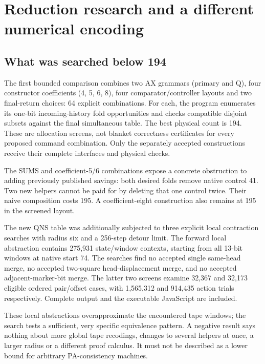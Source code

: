 \section{Reduction research and a different numerical encoding}
\label{sec:research}

\subsection{What was searched below 194}

The first bounded comparison combines two AX grammars (primary and Q),
four constructor coefficients (4, 5, 6, 8), four comparator/controller
layouts and two final-return choices: 64 explicit combinations. For each,
the program enumerates its one-bit incoming-history fold opportunities and
checks compatible disjoint subsets against the final simultaneous table.
The best physical count is 194. These are allocation screens, not blanket
correctness certificates for every proposed command combination. Only the
separately accepted constructions receive their complete interfaces and
physical checks.

The SUMS and coefficient-5/6 combinations expose a concrete obstruction to
adding previously published savings: both desired folds remove native
control 41. Two new helpers cannot be paid for by deleting that one control
twice. Their naive composition costs 195. A coefficient-eight construction
also remains at 195 in the screened layout.

The new QNS table was additionally subjected to three explicit local
contraction searches with radius six and a 256-step detour limit. The
forward local abstraction contains 275,931 state/window contexts, starting
from all 13-bit windows at native start 74. The searches find no accepted
single same-head merge, no accepted two-square head-displacement merge,
and no accepted adjacent-marker-bit merge. The latter two screens examine
32,367 and 32,173 eligible ordered pair/offset cases, with 1,565,312 and
914,435 action trials respectively. Complete output and the executable
JavaScript are included.

These local abstractions overapproximate the encountered tape windows;
the search tests a sufficient, very specific equivalence pattern. A negative
result says nothing about more global tape recodings, changes to several
helpers at once, a larger radius or a different proof calculus. It must not
be described as a lower bound for arbitrary PA-consistency machines.

